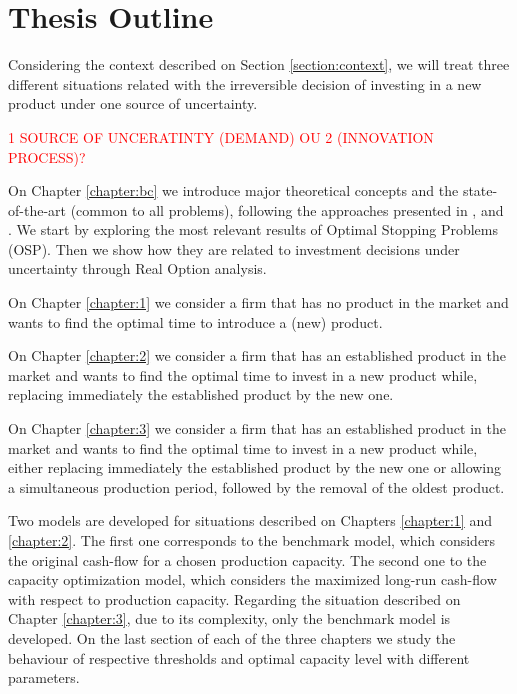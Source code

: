 \section{Thesis Outline}
\label{section:outline}

Considering the context described on Section \ref{section:context}, we will treat three different situations related with the irreversible decision of investing in a new product under one source of uncertainty.

\textcolor{red}{1 SOURCE OF UNCERATINTY (DEMAND) OU 2 (INNOVATION PROCESS)?}

On Chapter \ref{chapter:bc} we introduce major theoretical concepts and the state-of-the-art (common to all problems), following the approaches presented in \cite{dixit:book}, \cite{ross} and \cite{oksendal:book}.
We start by exploring the most relevant results of Optimal Stopping Problems (OSP). Then we show how they are related to investment decisions under uncertainty through Real Option analysis.

On Chapter \ref{chapter:1} we consider a firm that has no product in the market and wants to find the optimal time to introduce a (new) product.

On Chapter \ref{chapter:2} we consider a firm that has an established product in the market and wants to find the optimal time to invest in a new product while, replacing immediately the established product by the new one. 

On Chapter \ref{chapter:3} we consider a firm that has an established product in the market and wants to find the optimal time to invest in a new product while, either replacing immediately the established product by the new one or allowing a simultaneous production period, followed by the removal of the oldest product.

Two models are developed for situations described on Chapters \ref{chapter:1} and \ref{chapter:2}. The first one corresponds to the benchmark model, which considers the original cash-flow for a chosen production capacity. The second one to the capacity optimization model, which considers the maximized long-run cash-flow with respect to production capacity. 
Regarding the situation described on Chapter \ref{chapter:3}, due to its complexity, only the benchmark model is developed.
On the last section of each of the three chapters we study the behaviour of respective thresholds and optimal capacity level with different parameters.


